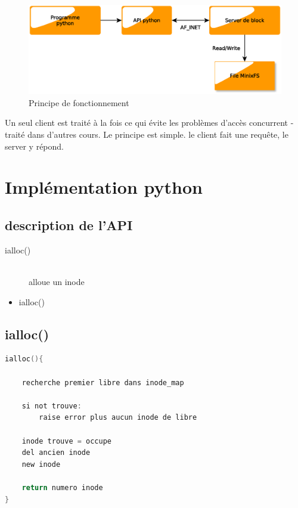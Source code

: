 \documentclass[a4paper,12pt]{article}
\begin{document}
\begin{figure}[H]
\begin{center}
\includegraphics[scale=.6]{imgs/schema_client_server}
\caption{Principe de fonctionnement}
\label{fig:Architecture client server}
\end{center}
\end{figure}


Un seul client est traité à la fois ce qui évite les problèmes d'accès concurrent - traité dans d'autres cours. Le principe est simple. le client fait une requête, le server y répond.\\



\section{Implémentation python}

\subsection{description de l'API}


\begin{description}
\item[ialloc()] \hfill \\
	alloue un inode
\end{description}
\begin{itemize}
\item ialloc()
\end{itemize}



\subsection{ialloc()}

\begin{lstlisting}[language=C, caption=pseudo code ialloc()()]
ialloc(){

	recherche premier libre dans inode_map
	
	si not trouve:
		raise error plus aucun inode de libre
	
	inode trouve = occupe
	del ancien inode
	new inode
	
	return numero inode
}
\end{lstlisting}
\end{document}
